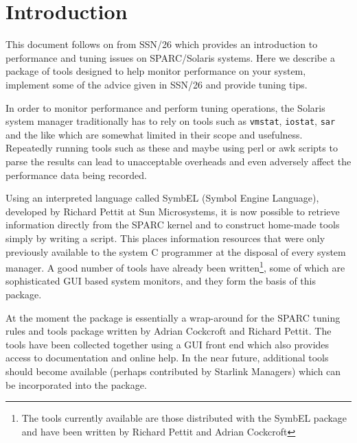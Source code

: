 \documentclass[11pt]{article}
\newcommand{\stardocinitials}  {SSN}
\newcommand{\stardocnumber}    {30.2}
\newcommand{\stardocname}{\stardocinitials /\stardocnumber}
\newenvironment{latexonly}{}{}
\newcommand{\xref}[3]{#1}
\begin{document}
\begin{latexonly}
   \setlength{\parskip}{0mm}
   \tableofcontents
   \setlength{\parskip}{\medskipamount}
   \markright{\stardocname}
\end{latexonly}

\newpage
\section{Introduction}

This document follows on from \xref{SSN/26}{ssn26}{} which provides an
introduction to performance and tuning issues on SPARC/Solaris systems.
Here we describe a package of tools designed to help monitor performance
on your system, implement some of the advice given in SSN/26 and provide
tuning tips.

In order to monitor performance and perform tuning operations, the Solaris
system manager traditionally has to rely on tools such as {\tt{vmstat}},
{\tt{iostat}}, {\tt{sar}} and the like which are somewhat limited in their
scope and usefulness. Repeatedly running tools such as these and maybe
using perl or awk scripts to parse the results can lead to unacceptable
overheads and even adversely affect the performance data being recorded.

Using an interpreted language called SymbEL (Symbol Engine Language),
developed by Richard Pettit at Sun Microsystems, it is now possible to
retrieve information directly from the SPARC kernel and to construct
home-made tools simply by writing a script. This places information
resources that were only previously available to the system C programmer
at the disposal of every system manager. A good number of tools have already
been written\footnote{The tools currently available are those distributed
with the SymbEL package and have been written by Richard Pettit and Adrian
Cockcroft}, some of which are sophisticated GUI based system monitors, and
they form the basis of this package.

At the moment the package is essentially a wrap-around for the SPARC tuning
rules and tools package written by Adrian Cockcroft and Richard Pettit. The
tools have been collected together using a GUI front end which also provides
access to documentation and online help. In the near future, additional tools
should become available (perhaps contributed by Starlink Managers) which
can be incorporated into the package.
\end{document}
